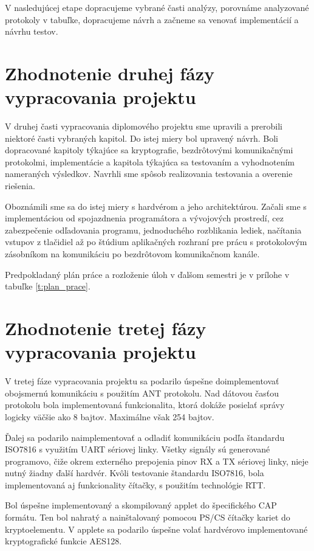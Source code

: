 \documentclass[12pt,a4wide,oneside,openright]{report}
\begin{document}
V nasledujúcej etape dopracujeme vybrané časti analýzy, porovnáme analyzované protokoly v tabuľke, dopracujeme návrh a začneme sa venovať implementácií a návrhu testov.

\section{Zhodnotenie druhej fázy vypracovania projektu}
V druhej časti vypracovania diplomového projektu sme upravili a prerobili niektoré časti vybraných kapitol. Do istej miery bol upravený návrh. Boli dopracované kapitoly týkajúce sa kryptografie, bezdrôtovými komunikačnými protokolmi, implementácie a kapitola týkajúca sa testovaním a vyhodnotením nameraných výsledkov. Navrhli sme spôsob realizovania testovania a overenie riešenia.

Oboznámili sme sa do istej miery s hardvérom a jeho architektúrou. Začali sme s implementáciou od spojazdnenia programátora a vývojových prostredí, cez zabezpečenie odľadovania programu, jednoduchého rozblikania lediek, načítania vstupov z tlačidiel až po štúdium aplikačných rozhraní pre prácu s protokolovým zásobníkom na komunikáciu po bezdrôtovom komunikačnom kanále.

Predpokladaný plán práce a rozloženie úloh v ďalšom semestri je v prílohe v tabuľke \ref{t:plan_prace}.


\section{Zhodnotenie tretej fázy vypracovania projektu}
V tretej fáze vypracovania projektu sa podarilo úspešne doimplementovať obojsmernú komunikáciu s použitím ANT protokolu. Nad dátovou časťou protokolu bola implementovaná funkcionalita, ktorá dokáže posielať správy logicky väčšie ako 8 bajtov. Maximálne však 254 bajtov.

Ďalej sa podarilo naimplementovať a odladiť komunikáciu podľa štandardu ISO7816 s využitím UART sériovej linky. Všetky signály sú generované programovo, čiže okrem externého prepojenia pinov RX a TX sériovej linky, nieje nutný žiadny ďalší hardvér.
Kvôli testovanie štandardu ISO7816, bola implementovaná aj funkcionality čítačky, s použitím technológie RTT.

Bol úspešne implementovaný a skompilovaný applet do špecifického CAP formátu. Ten bol nahratý a nainštalovaný pomocou PS/CS čítačky kariet do kryptoelementu. V applete sa podarilo úspešne volať hardvérovo implementované kryptografické funkcie AES128.
\end{document}
